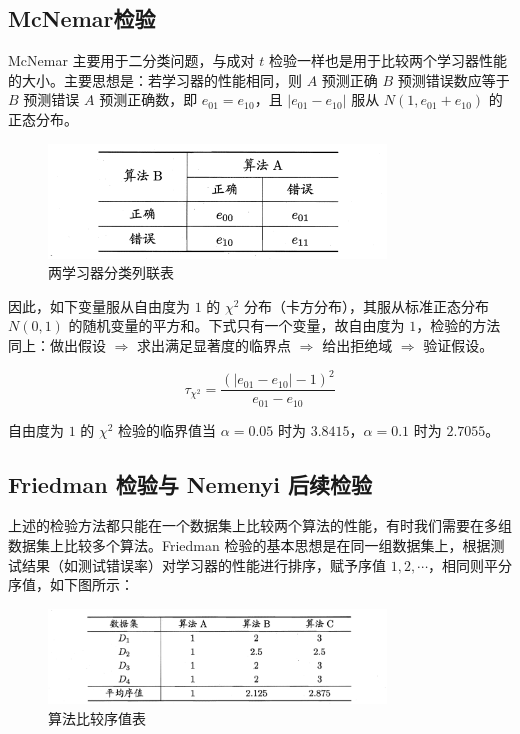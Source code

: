 \documentclass[12pt, a4paper]{article} %
\begin{document}
\subsection{McNemar检验}

McNemar 主要用于二分类问题，与成对 $t$ 检验一样也是用于比较两个学习器性能的大小。主要思想是：若学习器的性能相同，则 $A$ 预测正确 $B$ 预测错误数应等于 $B$ 预测错误 $A$ 预测正确数，即 $e_{01} = e_{10}$，且 $|e_{01} - e_{10}|$ 服从 $N(1, e_{01} + e_{10})$ 的正态分布。

\begin{figure}[H]
    \centering
    \includegraphics[width=0.8\textwidth]{../img/2-10-两学习器分类列联表.png}
    \caption{两学习器分类列联表}
    \label{fig:两学习器分类列联表}
\end{figure}

因此，如下变量服从自由度为 $1$ 的 $\chi^2$ 分布（卡方分布），其服从标准正态分布 $N(0, 1)$ 的随机变量的平方和。下式只有一个变量，故自由度为 $1$，检验的方法同上：做出假设 $\Rightarrow$ 求出满足显著度的临界点 $\Rightarrow$ 给出拒绝域 $\Rightarrow$ 验证假设。

\begin{equation*}
    \tau_{\chi^2} = \frac{(|e_{01} - e_{10}| - 1)^2}{e_{01} - e_{10}}
\end{equation*}

自由度为 $1$ 的 $\chi^2$ 检验的临界值当 $\alpha = 0.05$ 时为 $3.8415$，$\alpha = 0.1$ 时为 $2.7055$。

\subsection{Friedman 检验与 Nemenyi 后续检验}

上述的检验方法都只能在一个数据集上比较两个算法的性能，有时我们需要在多组数据集上比较多个算法。Friedman 检验的基本思想是在同一组数据集上，根据测试结果（如测试错误率）对学习器的性能进行排序，赋予序值 $1, 2, \cdots$，相同则平分序值，如下图所示：

\begin{figure}[H]
    \centering
    \includegraphics[width=0.8\textwidth]{../img/2-11-算法比较序值表.png}
    \caption{算法比较序值表}
    \label{fig:算法比较序值表}
\end{figure}
\end{document}
